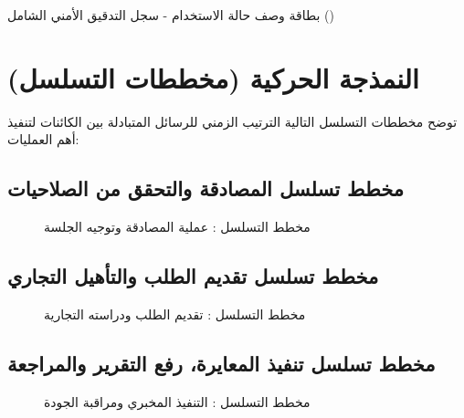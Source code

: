 \documentclass{bts-report-ar}
\begin{document}
\begin{usecasetablear}{بطاقة وصف حالة الاستخدام - سجل التدقيق الأمني الشامل ()}
\end{usecasetablear}

\section{النمذجة الحركية (مخططات التسلسل)}
توضح مخططات التسلسل التالية الترتيب الزمني للرسائل المتبادلة بين الكائنات لتنفيذ أهم العمليات:

\subsection{مخطط تسلسل المصادقة والتحقق من الصلاحيات}
\begin{figure}[H]
  \centering
  \begin{LTR}
  
  \end{LTR}
  \caption{مخطط التسلسل : عملية المصادقة وتوجيه الجلسة}
  \label{fig:seq-auth}
\end{figure}

\subsection{مخطط تسلسل تقديم الطلب والتأهيل التجاري}
\begin{figure}[H]
  \centering
  \begin{LTR}
  
  \end{LTR}
  \caption{مخطط التسلسل : تقديم الطلب ودراسته التجارية}
  \label{fig:seq-request}
\end{figure}

\subsection{مخطط تسلسل تنفيذ المعايرة، رفع التقرير والمراجعة}
\begin{figure}[H]
  \centering
  \begin{LTR}
  
  \end{LTR}
  \caption{مخطط التسلسل : التنفيذ المخبري ومراقبة الجودة}
  \label{fig:seq-calibration}
\end{figure}
\end{document}
